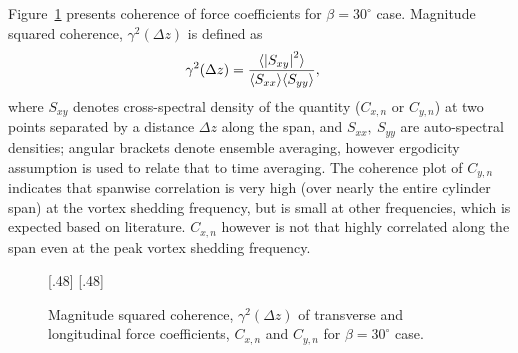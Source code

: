 Figure~\ref{fig:Coherence_Yawed30_Re20k} presents coherence of force
coefficients for $\beta=30^\circ$ case. Magnitude squared coherence,
$\gamma^2(\Delta z)$ is defined as
%
\begin{align}
  \gamma^2(\Delta z) &= \frac{\langle \left| S_{xy} \right|^2 \rangle}{\langle
    S_{xx}\rangle \langle S_{yy} \rangle},
  \label{eq:coherence}
\end{align}
%
where $S_{xy}$ denotes cross-spectral density of the quantity ($C_{x,n}$ or
$C_{y,n}$) at two points separated by a distance $\Delta z$ along the span, and
$S_{xx},~S_{yy}$ are auto-spectral densities; angular brackets denote ensemble
averaging, however ergodicity assumption is used to relate that to time
averaging. The coherence plot of $C_{y,n}$ indicates that spanwise correlation
is very high (over nearly the entire cylinder span) at the vortex shedding
frequency, but is small at other frequencies, which is expected based on
literature. $C_{x,n}$ however is not that highly correlated along the span even
at the peak vortex shedding frequency.
%
\begin{figure}[htb!]
    [.48\linewidth]{}
  \hspace*{\fill}
    [.48\linewidth]{}
    \caption{Magnitude squared coherence, $\gamma^2(\Delta z)$ of transverse
      and longitudinal force coefficients, $C_{x,n}$ and $C_{y,n}$ for
      $\beta=30^\circ$ case.}
  \label{fig:Coherence_Yawed30_Re20k}
\end{figure}
